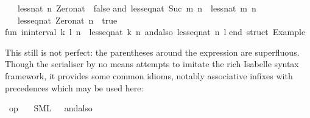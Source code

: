 \begin{isabellebody}
\begin{isamarkuptext}
\ \ {}\ less{}nat\ n\ Zero{}nat\ {}\ false\isanewline
and\ less{}eq{}nat\ {}Suc\ m{}\ n\ {}\ less{}nat\ m\ n\isanewline
\ \ {}\ less{}eq{}nat\ Zero{}nat\ n\ {}\ true{}\isanewline
\isanewline
fun\ in{}interval\ {}k{}\ l{}\ n\ {}\ {}less{}eq{}nat\ k\ n{}\ andalso\ {}less{}eq{}nat\ n\ l{}{}\isanewline
\isanewline
end{}\ {}{}struct\ Example{}{}\isanewline%
\end{isamarkuptext}%
\isamarkuptrue%
%
\endisatagquotetypewriter
{\isafoldquotetypewriter}%
%
\isadelimquotetypewriter
%
\endisadelimquotetypewriter
%
\begin{isamarkuptext}%
\noindent This still is not perfect: the parentheses around the
   expression are superfluous.  Though the serialiser by
  no means attempts to imitate the rich Isabelle syntax framework, it
  provides some common idioms, notably associative infixes with
  precedences which may be used here:%
\end{isamarkuptext}%
\isamarkuptrue%
%
\isadelimquotett
%
\endisadelimquotett
%
\isatagquotett
{}\isamarkupfalse%
\ {}op\ {}{}\isanewline
\ \ {}SML\ \ {}\ {}andalso{}{}%

\end{isabellebody}
